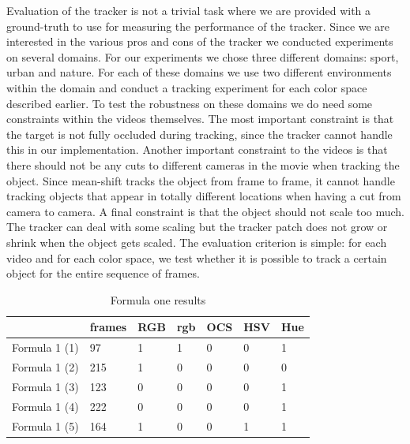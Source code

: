 \documentclass[a4paper,11pt]{article}
\begin{document}
		Evaluation of the tracker is not a trivial task where we are provided with a ground-truth
		to use for measuring the performance of the tracker. Since we are interested in the various
		pros and cons of the tracker we conducted experiments on several domains. For our experiments
		we chose three different domains: sport, urban and nature. For each of these domains we use
		two different environments within the domain and conduct a tracking experiment for each color
		space described earlier. To test the robustness on these domains we do need some constraints
		within the videos themselves. The most important constraint is that the target is not fully
		occluded during tracking, since the tracker cannot handle this in our implementation. Another
		important constraint to the videos is that there should not be any cuts to different cameras
		in the movie when tracking the object. Since mean-shift tracks the object from frame to frame,
		it cannot handle tracking objects that appear in totally different locations when having a cut
		from camera to camera. A final constraint is that the object should not scale too much. The
		tracker can deal with some scaling but the tracker patch does not grow or shrink when the object
		gets scaled. The evaluation criterion is simple: for each video and for each color space, we test
		whether it is possible to track a certain object for the entire sequence of frames.
		\begin{table}[H]
			\centering
			\begin{tabular}{| l | l | l | l | l | l | l |}
			\hline
			             & frames & RGB & rgb & OCS & HSV & Hue \\
			\hline
			Formula 1 (1)&  97 & 1   & 1   & 0   & 0   & 1 \\
			Formula 1 (2)& 215 & 1   & 0   & 0   & 0   & 0 \\
			Formula 1 (3)& 123 & 0   & 0   & 0   & 0   & 1 \\
			Formula 1 (4)& 222 & 0   & 0   & 0   & 0   & 1 \\
			Formula 1 (5)& 164 & 1   & 0   & 0   & 1   & 1 \\
			\hline
			\end{tabular}
			\caption{Formula one results}
			\label{table:f1}
		\end{table}
\end{document}
